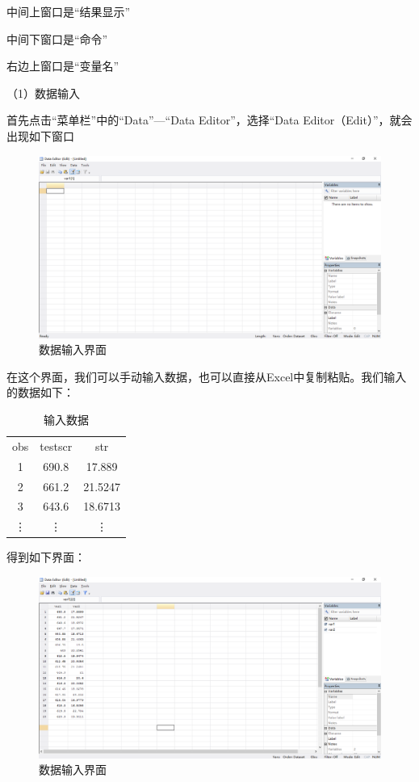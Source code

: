 \documentclass[cn,12pt,math=newtx,citestyle=gb7714-2015,bibstyle=gb7714-2015]{elegantbook}
\begin{document}
	中间上窗口是“结果显示”
	
	中间下窗口是“命令”
	
	右边上窗口是“变量名”
	
	（1）数据输入
	
	首先点击“菜单栏”中的“Data”—“Data Editor”，选择“Data Editor（Edit）”，就会出现如下窗口
	\begin{figure}[htbp]
		\centering
		\includegraphics[width=1\textwidth]{data edit.png}
		\caption{数据输入界面}\label{fig:digit}
	\end{figure}
	
	在这个界面，我们可以手动输入数据，也可以直接从Excel中复制粘贴。我们输入的数据如下：
	\begin{table}[htbp]
		\caption{输入数据}\label{tab:digit}
		\centering
		\begin{tabular}{ccc}
			\hline
			obs&testscr&str\\
			1&690.8&17.889\\
			2&661.2&21.5247\\
			3&643.6&18.6713\\
			\vdots&\vdots&\vdots\\
			\hline
		\end{tabular}
	\end{table}
	
	得到如下界面：
	\begin{figure}[htbp]
		\centering
		\includegraphics[width=1\textwidth]{data edit1.png}
		\caption{数据输入界面}\label{fig:digit}
	\end{figure}
	
\end{document}

